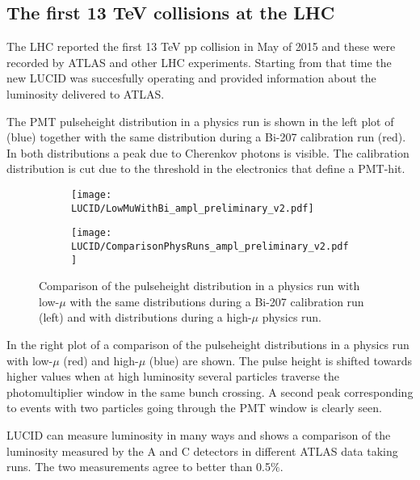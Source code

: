 \subsection{The first 13 TeV collisions at the LHC}
\label{sec:physics}

The LHC reported the first 13 TeV pp collision in May of 2015 and these were recorded by ATLAS and other LHC experiments. 
Starting from that time the new LUCID was succesfully operating and provided information about the 
luminosity delivered to ATLAS. 

The PMT pulseheight distribution in a physics run is shown in the left plot of  (blue) 
together with the same distribution 
during a Bi-207 calibration run (red). In both distributions a peak due to Cherenkov photons is visible. The 
calibration distribution is cut due to the threshold in the electronics that define a PMT-hit.

\begin{figure}
\centering
\begin{subfigure}{.5\textwidth}
  \centering
  \texttt{[image: LUCID/LowMuWithBi\_ampl\_preliminary\_v2.pdf]}
  \label{fig:sub1}
\end{subfigure}%
\begin{subfigure}{.5\textwidth}
  \centering
  \texttt{[image: LUCID/ComparisonPhysRuns\_ampl\_preliminary\_v2.pdf]}
  \label{fig:sub2}
\end{subfigure}
\caption{Comparison of the pulseheight distribution in a physics run with low-$\mu$ with the same distributions 
during a Bi-207 calibration run (left) and with distributions during a high-$\mu$ physics run.}
\label{fig:Pulseheight}
\end{figure}

In the right plot of  a comparison of the pulseheight distributions in a physics run 
with low-$\mu$ (red) and high-$\mu$ (blue) are shown. The pulse height is shifted towards higher values when at high 
luminosity several particles traverse the photomultiplier window in the same bunch crossing.
A second peak corresponding to events with two particles going through the PMT window is clearly seen.

LUCID can measure luminosity in many ways and  shows a comparison of the 
luminosity measured by the A and C detectors in different ATLAS data taking runs. The two measurements agree to better than 0.5$\%$.

